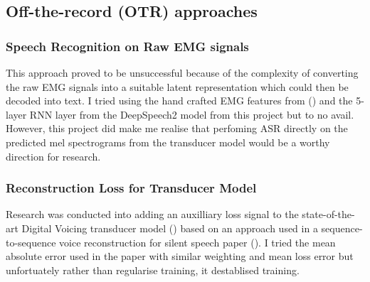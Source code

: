 \subsection{Off-the-record (OTR) approaches}

\subsubsection{Speech Recognition on Raw EMG signals}

This approach proved to be unsuccessful because of the complexity
of converting the raw EMG signals into a suitable latent representation
which could then be decoded into text. I tried using the hand crafted
EMG features from (\cite{gaddy2020digital}) and the 5-layer RNN
layer from the DeepSpeech2 model from this project but to no avail.
However, this project did make me realise that perfoming ASR directly
on the predicted mel spectrograms from the transducer model would be
a worthy direction for research.

\subsubsection{Reconstruction Loss for Transducer Model}

Research was conducted into adding an auxilliary loss signal
to the state-of-the-art Digital Voicing transducer model
(\cite{gaddy2021improved}) based on an approach
used in a sequence-to-sequence voice reconstruction
for silent speech paper (\cite{chinese_silent_speech}).
I tried the mean absolute error used in the paper with similar
weighting and mean loss error but unfortuately rather than regularise
training, it destablised training.